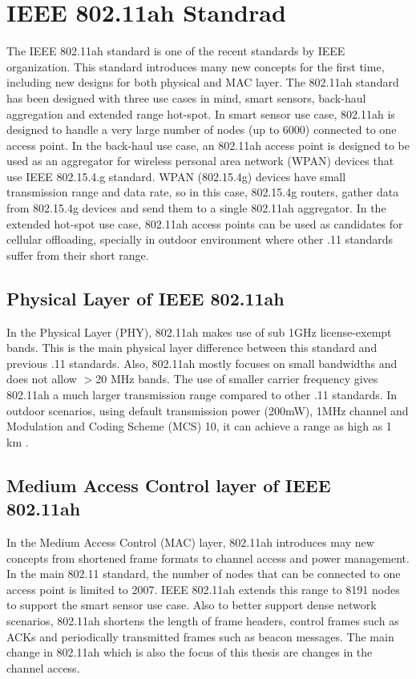 \label{chapter:background}

\section{IEEE 802.11ah Standrad}

 The IEEE 802.11ah standard is one of the recent standards by IEEE organization. This standard introduces many new concepts for the first time, including new designs for both physical and MAC layer. The 802.11ah standard has been designed with three use cases in mind, smart sensors, back-haul aggregation and extended range hot-spot. In smart sensor use case, 802.11ah is designed to handle a very large number of nodes (up to 6000) connected to one access point. In the back-haul use case, an 802.11ah access point is designed to be used as an aggregator for wireless personal area network (WPAN) devices that use IEEE 802.15.4.g standard. WPAN (802.15.4g) devices have small transmission range and data rate, so in this case, 802.15.4g routers, gather data from 802.15.4g devices and send them to a single 802.11ah aggregator. In the extended hot-spot use case, 802.11ah access points can be used as candidates for cellular offloading, specially in outdoor environment where other .11 standards suffer from their short range.

\subsection{Physical Layer of IEEE 802.11ah}
In the Physical Layer (PHY), 802.11ah makes use of sub 1GHz license-exempt bands. This is the main physical layer difference between this standard and previous .11 standards. Also, 802.11ah mostly focuses on small bandwidths and does not allow $>$20 MHz bands. The use of smaller carrier frequency gives 802.11ah a much larger transmission range compared to other .11 standards. In outdoor scenarios, using default transmission power (200mW), 1MHz channel and Modulation and Coding Scheme (MCS) 10, it can achieve a range as high as 1 km \cite{khorov2015survey}. 

\subsection{Medium Access Control layer of IEEE 802.11ah}
 In the Medium Access Control (MAC) layer, 802.11ah introduces may new concepts from shortened frame formats to channel access and power management. In the main 802.11 standard, the number of nodes that can be connected to one access point is limited to 2007. IEEE 802.11ah extends this range to 8191 nodes to support the smart sensor use case. Also to better support dense network scenarios, 802.11ah shortens the length of frame headers, control frames such as ACKs and periodically transmitted frames such as beacon messages. The main change in 802.11ah which is also the focus of this thesis are changes in the channel access. 

